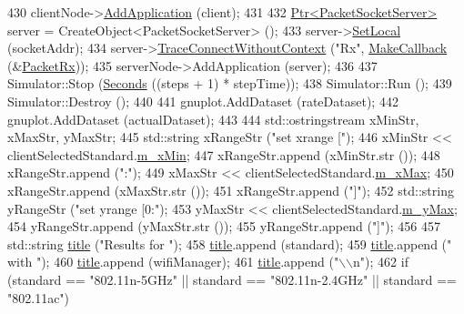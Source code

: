 \begin{DoxyCode}
{430   clientNode->\hyperlink{classns3_1_1Node_ab98b4fdc4aadc86366b80e8a79a53f47}{AddApplication} (client);
431 
432   \hyperlink{classns3_1_1Ptr}{Ptr<PacketSocketServer>} server = CreateObject<PacketSocketServer> ();
433   server->\hyperlink{classns3_1_1PacketSocketServer_a89207b49054571b480ee1d26934907d3}{SetLocal} (socketAddr);
434   server->\hyperlink{classns3_1_1ObjectBase_a1be45f6fd561e75dcac9dfa81b2b81e4}{TraceConnectWithoutContext} (\textcolor{stringliteral}{"Rx"}, 
      \hyperlink{group__makecallbackmemptr_ga9376283685aa99d204048d6a4b7610a4}{MakeCallback} (&\hyperlink{wifi-manager-example_8cc_a58be0453724cdae9cedb709d670d66c6}{PacketRx}));
435   serverNode->AddApplication (server);
436 
437   Simulator::Stop (\hyperlink{group__timecivil_ga33c34b816f8ff6628e33d5c8e9713b9e}{Seconds} ((steps + 1) * stepTime));
438   Simulator::Run ();
439   Simulator::Destroy ();
440 
441   gnuplot.AddDataset (rateDataset);
442   gnuplot.AddDataset (actualDataset);
443 
444   std::ostringstream xMinStr, xMaxStr, yMaxStr;
445   std::string xRangeStr (\textcolor{stringliteral}{"set xrange ["});
446   xMinStr << clientSelectedStandard.\hyperlink{structStandardInfo_af07b86a8ed5fc63871218325776c77e1}{m\_xMin};
447   xRangeStr.append (xMinStr.str ());
448   xRangeStr.append (\textcolor{stringliteral}{":"});
449   xMaxStr << clientSelectedStandard.\hyperlink{structStandardInfo_a9273620f117082177fb82865c3372e41}{m\_xMax};
450   xRangeStr.append (xMaxStr.str ());
451   xRangeStr.append (\textcolor{stringliteral}{"]"});
452   std::string yRangeStr (\textcolor{stringliteral}{"set yrange [0:"});
453   yMaxStr << clientSelectedStandard.\hyperlink{structStandardInfo_a7037180b40be174fdb983b9c92084a1f}{m\_yMax};
454   yRangeStr.append (yMaxStr.str ());
455   yRangeStr.append (\textcolor{stringliteral}{"]"});
456 
457   std::string \hyperlink{lte__link__budget_8m_a5b09b57ee35b13a452f0c089c0709f8b}{title} (\textcolor{stringliteral}{"Results for "});
458   \hyperlink{lte__link__budget_8m_a5b09b57ee35b13a452f0c089c0709f8b}{title}.append (standard);
459   \hyperlink{lte__link__budget_8m_a5b09b57ee35b13a452f0c089c0709f8b}{title}.append (\textcolor{stringliteral}{" with "});
460   \hyperlink{lte__link__budget_8m_a5b09b57ee35b13a452f0c089c0709f8b}{title}.append (wifiManager);
461   \hyperlink{lte__link__budget_8m_a5b09b57ee35b13a452f0c089c0709f8b}{title}.append (\textcolor{stringliteral}{"\(\backslash\)\(\backslash\)n"});
462   \textcolor{keywordflow}{if} (standard == \textcolor{stringliteral}{"802.11n-5GHz"} || standard == \textcolor{stringliteral}{"802.11n-2.4GHz"} || standard == \textcolor{stringliteral}{"802.11ac"})
}
\end{DoxyCode}
